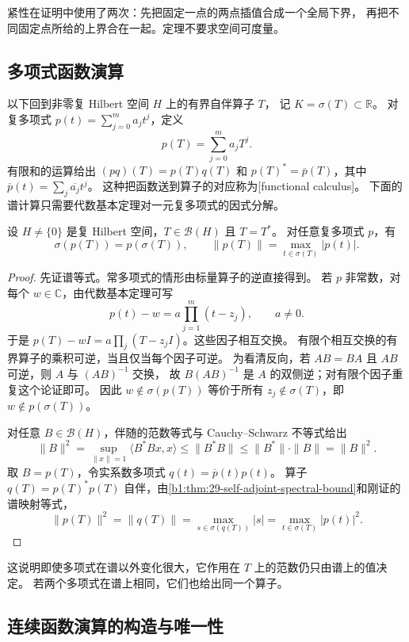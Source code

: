 紧性在证明中使用了两次：先把固定一点的两点插值合成一个全局下界，
再把不同固定点所给的上界合在一起。定理不要求空间可度量。

\subsection{多项式函数演算}
\label{b1:subsec:290203}

以下回到非零复 Hilbert 空间 \(H\) 上的有界自伴算子 \(T\)，
记 \(K=\sigma(T)\subset\mathbb R\)。
对复多项式 \(p(t)=\sum_{j=0}^m a_jt^j\)，定义
\[
 p(T)=\sum_{j=0}^m a_jT^j.
\]
有限和的运算给出 \((pq)(T)=p(T)q(T)\) 和
\(p(T)^*=\overline p(T)\)，其中 \(\overline p(t)=\sum_j\overline{a_j}t^j\)。
这种把函数送到算子的对应称为[functional calculus]。
下面的谱计算只需要代数基本定理对一元复多项式的因式分解。

\begin{proposition}[多项式谱映射与范数]
\label{b1:prop:29-polynomial-calculus}
设 \(H\ne\{0\}\) 是复 Hilbert 空间，\(T\in\mathcal B(H)\) 且 \(T=T^*\)。
对任意复多项式 \(p\)，有
\[
 \sigma(p(T))=p(\sigma(T)),\qquad
 \|p(T)\|=\max_{t\in\sigma(T)}|p(t)|.
\]
\end{proposition}
\begin{proof}
先证谱等式。常多项式的情形由标量算子的逆直接得到。
若 \(p\) 非常数，对每个 \(w\in\mathbb C\)，由代数基本定理可写
\[
 p(t)-w=a\prod_{j=1}^m(t-z_j),\qquad a\ne0.
\]
于是 \(p(T)-wI=a\prod_j(T-z_jI)\)。这些因子相互交换。
有限个相互交换的有界算子的乘积可逆，当且仅当每个因子可逆。
为看清反向，若 \(AB=BA\) 且 \(AB\) 可逆，则 \(A\) 与 \((AB)^{-1}\) 交换，
故 \(B(AB)^{-1}\) 是 \(A\) 的双侧逆；对有限个因子重复这个论证即可。
因此 \(w\notin\sigma(p(T))\) 等价于所有 \(z_j\notin\sigma(T)\)，即 \(w\notin p(\sigma(T))\)。

对任意 \(B\in\mathcal B(H)\)，伴随的范数等式与 Cauchy--Schwarz 不等式给出
\[
 \|B\|^2=\sup_{\|x\|=1}\langle B^*Bx,x\rangle
 \leq\|B^*B\|\leq\|B^*\|\cdot\|B\|=\|B\|^2.
\]
取 \(B=p(T)\)，令实系数多项式 \(q(t)=\overline p(t)p(t)\)。
算子 \(q(T)=p(T)^*p(T)\) 自伴，由\cref{b1:thm:29-self-adjoint-spectral-bound}和刚证的谱映射等式，
\[
 \|p(T)\|^2=\|q(T)\|
 =\max_{s\in\sigma(q(T))}|s|
 =\max_{t\in\sigma(T)}|p(t)|^2.
\]
\end{proof}

这说明即使多项式在谱以外变化很大，它作用在 \(T\) 上的范数仍只由谱上的值决定。
若两个多项式在谱上相同，它们也给出同一个算子。

\subsection{连续函数演算的构造与唯一性}
\label{b1:subsec:290204}

